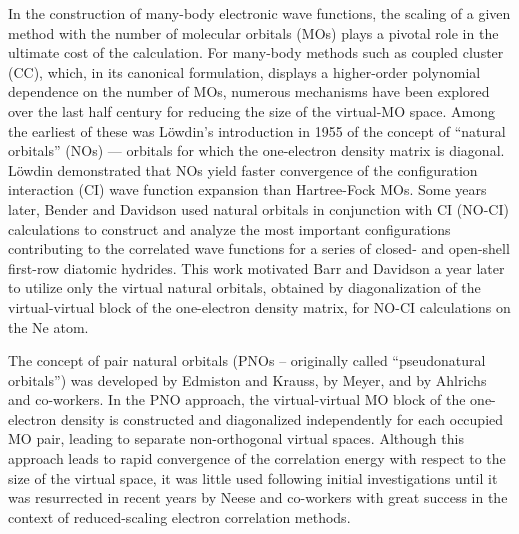 In the construction of many-body electronic wave functions, the scaling of a
given method with the number of molecular orbitals (MOs) plays a pivotal role
in the ultimate cost of the calculation.  For many-body methods such as
coupled cluster (CC),\cite{Shavitt09,Gauss98,Crawford00:review} which, in its
canonical formulation, displays a higher-order polynomial dependence on the
number of MOs, numerous mechanisms have been explored over the last half
century for reducing the size of the virtual-MO space.  Among the earliest of
these was L{\"o}wdin's\cite{Lowdin55} introduction in 1955 of the concept of
``natural orbitals'' (NOs) --- orbitals for which the one-electron density
matrix is diagonal.  L\"owdin demonstrated that NOs yield faster convergence
of the configuration interaction (CI) wave function expansion than Hartree-Fock MOs.  Some years later,
Bender and Davidson\cite{Bender69} used natural orbitals in conjunction with
CI (NO-CI) calculations to construct and analyze the most important
configurations contributing to the correlated wave functions for a series of
closed- and open-shell first-row diatomic hydrides.  This work motivated Barr
and Davidson a year later\cite{Barr70} to utilize only the virtual natural
orbitals, obtained by diagonalization of the virtual-virtual block of
the one-electron density matrix, for NO-CI calculations on the Ne atom.

The concept of pair natural orbitals (PNOs -- originally called
``pseudonatural orbitals'') was developed by Edmiston and
Krauss,\cite{Edmiston66} by Meyer\cite{Meyer73}, and by Ahlrichs and
co-workers.\cite{Ahlrichs75} In the PNO approach, the virtual-virtual MO block
of the one-electron density is constructed and diagonalized independently for
each occupied MO pair, leading to separate non-orthogonal virtual spaces.
Although this approach leads to rapid convergence of the correlation energy
with respect to the size of the virtual space, it was little used following
initial investigations until it was resurrected in recent years by Neese and
co-workers with great success in the context of reduced-scaling electron
correlation methods.\cite{Neese09,Riplinger16}

